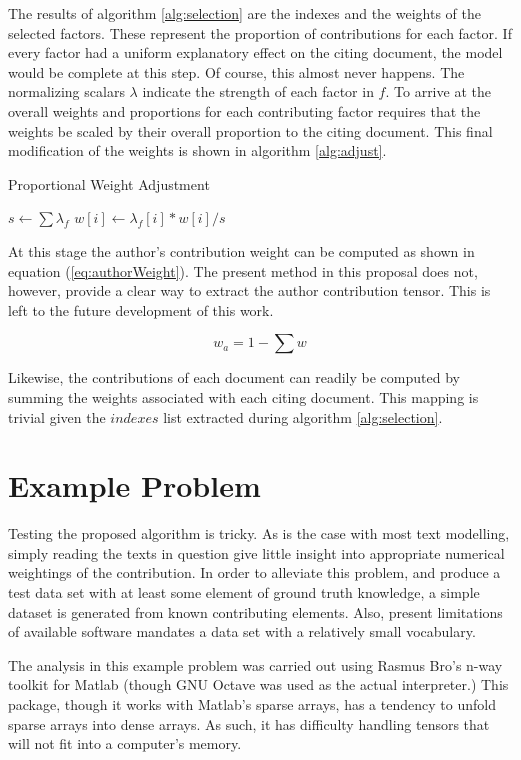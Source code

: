 \documentclass{article}
\begin{document}
The results of algorithm \ref{alg:selection} are the
indexes and the weights of the selected factors.  These represent the
proportion of contributions for each factor.  If every factor had
a uniform explanatory effect on the citing document, the model would
be complete at this step.  Of course, this almost never happens.  The
normalizing scalars $\lambda$ indicate the strength of each factor in
$f$.  To arrive at the overall weights and proportions for each
contributing factor requires that the weights be scaled by their
overall proportion to the citing document.  This final modification of
the weights is shown in algorithm \ref{alg:adjust}.

\begin{algorithm}
    \caption{Proportional Weight Adjustment}
    \label{alg:adjust}
    $s \leftarrow \sum \lambda_f$\;
     {
        $w[i] \leftarrow \lambda_f[i] * w[i] / s$\;
    }
\end{algorithm}

At this stage the author's contribution weight can be computed as
shown in equation (\ref{eq:authorWeight}).  The present method in this
proposal does not, however, provide a clear way to extract the author
contribution tensor.  This is left to the future development of this
work.

\begin{equation}
    \label{eq:authorWeight}
    w_a = 1 - \sum w
\end{equation}

Likewise, the contributions of each document can readily be computed
by summing the weights associated with each citing document.  This
mapping is trivial given the $indexes$ list extracted during algorithm
\ref{alg:selection}. 

\section{Example Problem}
Testing the proposed algorithm is tricky.  As is the case with most
text modelling, simply reading the texts in question give little
insight into appropriate numerical weightings of the contribution.  In
order to alleviate this problem, and produce a test data set with at
least some element of ground truth knowledge, a simple dataset is
generated from known contributing elements.  Also, present limitations
of available software mandates a data set with a relatively small
vocabulary.

The analysis in this example problem was carried out using Rasmus
Bro's n-way toolkit \cite{andersson2000} for Matlab (though GNU Octave was used as the
actual interpreter.)  This package, though it works with Matlab's
sparse arrays, has a tendency to unfold sparse arrays into dense
arrays.  As such, it has difficulty handling tensors that will not fit
into a computer's memory.  
\end{document}
